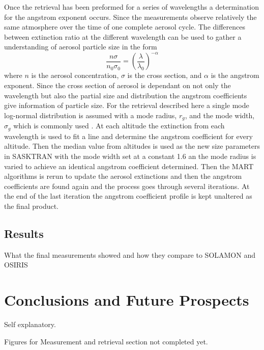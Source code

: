 \documentclass[12pt, draft]{article}
\begin{document}
Once the retrieval has been preformed for a series of wavelengths a determination for the angstrom exponent occurs. Since the measurements observe relatively the same atmosphere over the time of one complete aerosol cycle. The differences between extinction ratio at the different wavelength can be used to gather a understanding of aerosol particle size in the form
\begin{equation}
    \frac{n\sigma}{n_{0}\sigma_{0}} = \left(\frac{\lambda}{\lambda_{0}}\right)^{-\alpha}
    \label{eqn:agstromCoefficient}
\end{equation}
where $n$ is the aerosol concentration, $\sigma$ is the cross section, and $\alpha$ is the angstrom exponent. Since the cross section of aerosol is dependant on not only the wavelength but also the partial size and distribution the angstrom coefficients give information of particle size. For the retrieval described here a single mode log-normal distribution is assumed with a mode radius, $r_{g}$, and the mode width, $\sigma_{g}$ which is commonly used \citep{Bingen2004}. At each altitude the extinction from each wavelength is used to fit a line and determine the angstrom coefficient for every altitude. Then the median value from altitudes is used as the new size parameters in SASKTRAN with the mode width set at a constant 1.6 an the mode radius is varied to achieve an identical angstrom coefficient determined. Then the MART algorithms is rerun to update the aerosol extinctions and then the angstrom coefficients are found again and the process goes through several iterations. At the end of the last iteration the angstrom coefficient profile is kept unaltered as the final product.

\subsection{Results}

What the final measurements showed and how they compare to SOLAMON and OSIRIS

\section{Conclusions and Future Prospects}

Self explanatory.

Figures for Measurement and retrieval section not completed yet.

\newpage



\newpage
\end{document}
